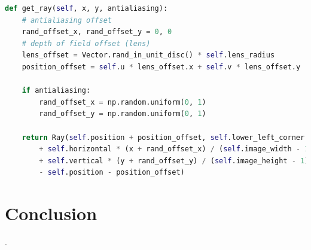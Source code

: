 \documentclass[]{article}
\begin{document}
			\begin{lstlisting}[caption={Method to generate a ray for given pixel coordinates using antialisaing and thin lens approximation}, language=Python, label=lst:getray]
def get_ray(self, x, y, antialiasing):
	# antialiasing offset
	rand_offset_x, rand_offset_y = 0, 0
	# depth of field offset (lens)
	lens_offset = Vector.rand_in_unit_disc() * self.lens_radius
	position_offset = self.u * lens_offset.x + self.v * lens_offset.y
	
	if antialiasing:
		rand_offset_x = np.random.uniform(0, 1)
		rand_offset_y = np.random.uniform(0, 1)
	
	return Ray(self.position + position_offset, self.lower_left_corner 
		+ self.horizontal * (x + rand_offset_x) / (self.image_width - 1) 
		+ self.vertical * (y + rand_offset_y) / (self.image_height - 1) 
		- self.position - position_offset)
			\end{lstlisting}
	
	\section{Conclusion}
	
	\clearpage
	\printbibliography[heading=bibintoc].
		
\end{document}

